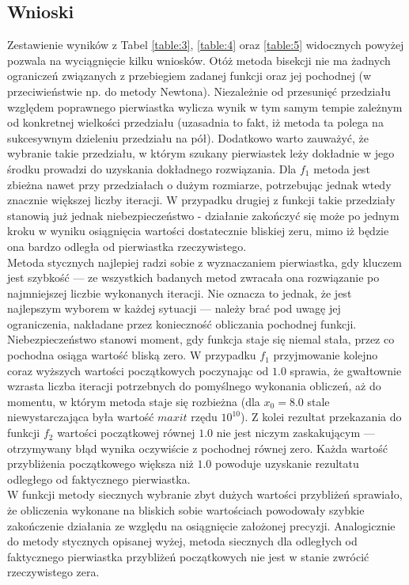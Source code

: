 \documentclass{classrep}
\begin{document}
	\subsection{Wnioski}
		Zestawienie wyników z Tabel \ref{table:3}, \ref{table:4} oraz \ref{table:5} widocznych powyżej pozwala na wyciągnięcie kilku wniosków. Otóż metoda bisekcji nie ma żadnych ograniczeń związanych z przebiegiem zadanej funkcji oraz jej pochodnej (w przeciwieństwie np. do metody Newtona). Niezależnie od przesunięć przedziału względem poprawnego pierwiastka wylicza wynik w tym samym tempie zależnym od konkretnej wielkości przedziału (uzasadnia to fakt, iż metoda ta polega na sukcesywnym dzieleniu przedziału na pół). Dodatkowo warto zauważyć, że wybranie takie przedziału, w którym szukany pierwiastek leży dokładnie w jego środku prowadzi do uzyskania dokładnego rozwiązania. Dla $f_1$ metoda jest zbieżna nawet przy przedziałach o dużym rozmiarze, potrzebując jednak wtedy znacznie większej liczby iteracji. W przypadku drugiej z funkcji takie przedziały stanowią już jednak niebezpieczeństwo - działanie zakończyć się może po jednym kroku w wyniku osiągnięcia wartości dostatecznie bliskiej zeru, mimo iż będzie ona bardzo odległa od pierwiastka rzeczywistego. \\
		 Metoda stycznych najlepiej radzi sobie z wyznaczaniem pierwiastka, gdy kluczem jest szybkość --- ze wszystkich badanych metod zwracała ona rozwiązanie po najmniejszej liczbie wykonanych iteracji. Nie oznacza to jednak, że jest najlepszym wyborem w każdej sytuacji --- należy brać pod uwagę jej ograniczenia, nakładane przez konieczność obliczania pochodnej funkcji. Niebezpieczeństwo stanowi moment, gdy funkcja staje się niemal stała, przez co pochodna osiąga wartość bliską zero. W przypadku $f_1$ przyjmowanie kolejno coraz wyższych wartości początkowych poczynając od $1.0$ sprawia, że gwałtownie wzrasta liczba iteracji potrzebnych do pomyślnego wykonania obliczeń, aż do momentu, w którym metoda staje się rozbieżna (dla $x_0=8.0$ stale niewystarczająca była wartość $maxit$ rzędu $10^{10}$). Z kolei rezultat przekazania do funkcji $f_2$ wartości początkowej równej $1.0$ nie jest niczym zaskakującym --- otrzymywany błąd wynika oczywiście z pochodnej równej zero. Każda wartość przybliżenia początkowego większa niż $1.0$ powoduje uzyskanie rezultatu odległego od faktycznego pierwiastka. \\
		 W funkcji metody siecznych wybranie zbyt dużych wartości przybliżeń sprawiało, że obliczenia wykonane na bliskich sobie wartościach powodowały szybkie zakończenie działania ze względu na osiągnięcie założonej precyzji. Analogicznie do metody stycznych opisanej wyżej, metoda siecznych dla odległych od faktycznego pierwiastka przybliżeń początkowych nie jest w stanie zwrócić rzeczywistego zera.
		 
		
		
		
\end{document}

